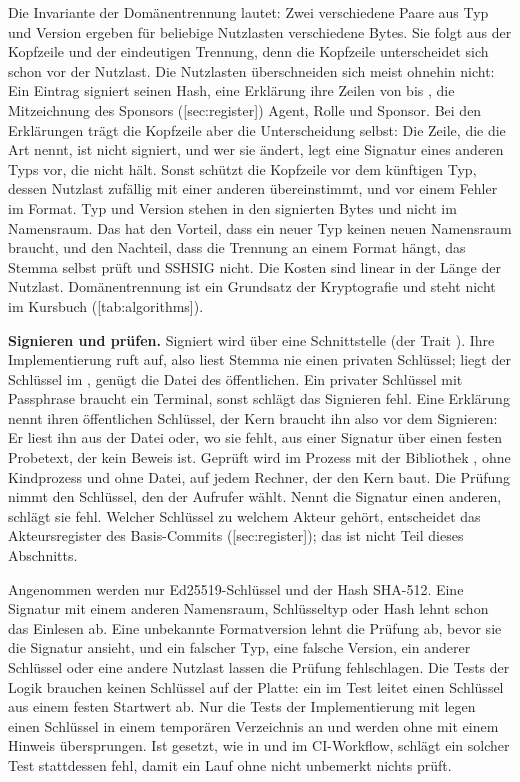Die Invariante der Domänentrennung lautet: Zwei verschiedene Paare aus Typ und Version ergeben
für beliebige Nutzlasten verschiedene Bytes.
Sie folgt aus der Kopfzeile und der eindeutigen Trennung, denn die Kopfzeile unterscheidet sich
schon vor der Nutzlast.
Die Nutzlasten überschneiden sich meist ohnehin nicht: Ein Eintrag signiert seinen Hash,
eine Erklärung ihre Zeilen von  bis , die Mitzeichnung des Sponsors
([sec:register]) Agent, Rolle und Sponsor.
Bei den Erklärungen trägt die Kopfzeile aber die Unterscheidung selbst: Die Zeile, die die Art
nennt, ist nicht signiert, und wer sie ändert, legt eine Signatur eines anderen Typs vor, die
nicht hält.
Sonst schützt die Kopfzeile vor dem künftigen Typ, dessen Nutzlast zufällig mit einer anderen
übereinstimmt, und vor einem Fehler im Format.
Typ und Version stehen in den signierten Bytes und nicht im Namensraum.
Das hat den Vorteil, dass ein neuer Typ keinen neuen Namensraum braucht,
und den Nachteil, dass die Trennung an einem Format hängt,
das Stemma selbst prüft und SSHSIG nicht.
Die Kosten sind linear in der Länge der Nutzlast.
Domänentrennung ist ein Grundsatz der Kryptografie und steht nicht im Kursbuch
([tab:algorithms]).

{\bf Signieren und prüfen.}
Signiert wird über eine Schnittstelle (der Trait ).
Ihre Implementierung ruft  auf, also liest Stemma nie einen privaten
Schlüssel; liegt der Schlüssel im , genügt die Datei des öffentlichen.
Ein privater Schlüssel mit Passphrase braucht ein Terminal, sonst schlägt das Signieren fehl.
Eine Erklärung nennt ihren öffentlichen Schlüssel, der Kern braucht ihn also vor dem Signieren:
Er liest ihn aus der Datei  oder, wo sie fehlt, aus einer Signatur
über einen festen Probetext, der kein Beweis ist.
Geprüft wird im Prozess mit der Bibliothek , ohne Kindprozess und ohne Datei,
auf jedem Rechner, der den Kern baut.
Die Prüfung nimmt den Schlüssel, den der Aufrufer wählt.
Nennt die Signatur einen anderen, schlägt sie fehl.
Welcher Schlüssel zu welchem Akteur gehört, entscheidet das Akteursregister des Basis-Commits
([sec:register]); das ist nicht Teil dieses Abschnitts.

Angenommen werden nur Ed25519-Schlüssel und der Hash SHA-512.
Eine Signatur mit einem anderen Namensraum, Schlüsseltyp oder Hash lehnt schon das Einlesen ab.
Eine unbekannte Formatversion lehnt die Prüfung ab, bevor sie die Signatur ansieht,
und ein falscher Typ, eine falsche Version, ein anderer Schlüssel oder eine andere Nutzlast
lassen die Prüfung fehlschlagen.
Die Tests der Logik brauchen keinen Schlüssel auf der Platte: ein  im Test leitet
einen Schlüssel aus einem festen Startwert ab.
Nur die Tests der Implementierung mit  legen einen Schlüssel in einem
temporären Verzeichnis an und werden ohne  mit einem Hinweis übersprungen.
Ist  gesetzt, wie in  und im CI-Workflow,
schlägt ein solcher Test stattdessen fehl,
damit ein Lauf ohne  nicht unbemerkt nichts prüft.

